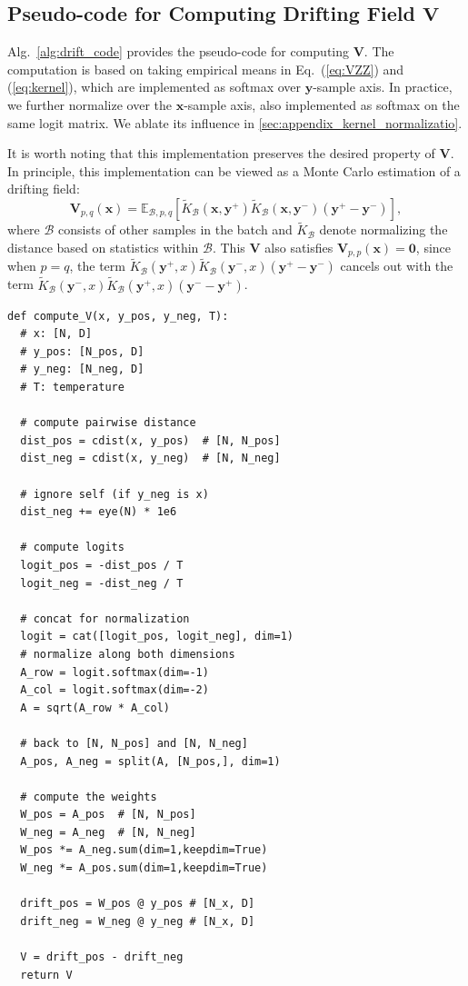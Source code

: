 \documentclass{article}
\newcommand{\vv}[1]{\mathbf{#1}}
\newcommand{\x}{\vv{x}}
\newcommand{\y}{\vv{y}}
\newcommand{\V}{\vv{V}}
\newcommand{\yp}{{\textcolor{blue}{\vv{y}^{+}}}}
\newcommand{\yn}{{\textcolor{orange}{\vv{y}^{-}}}}
\theoremstyle{plain}
\theoremstyle{definition}
\theoremstyle{remark}
\begin{document}
\subsection{Pseudo-code for Computing Drifting Field $\V$}
\label{sec:appendix_compute_V}

Alg.~\ref{alg:drift_code} provides the pseudo-code for computing $\V$. The computation is based on taking empirical means in Eq.~(\ref{eq:VZZ}) and (\ref{eq:kernel}), which are implemented as softmax over $\y$-sample axis. In practice, we further normalize over the $\x$-sample axis, also implemented as softmax on the same logit matrix.
We ablate its influence in \ref{sec:appendix_kernel_normalizatio}.

\renewcommand{\yn}{\y^{-}}
\renewcommand{\yp}{\y^{+}}
\newcommand{\B}{\mathcal{B}}

It is worth noting that this implementation preserves the desired property of $\V$.
In principle, this implementation can be viewed as a Monte Carlo estimation of a drifting field:
\begin{equation}
\V_{p,q}(\x)=\mathbb E_{\B,p,q}[\tilde K_\B(\x, \yp)\tilde K_\B(\x, \yn)(\yp-\yn)],
\end{equation}
where $\B$ consists of other samples in the batch and $\tilde K_\B$ denote normalizing the distance based on statistics within $\B$. This $\V$ also satisfies $\V_{p,p}(\x)=\mathbf 0$, since when $p=q$, the term  $\tilde K_\B(\yp, x)\tilde K_\B(\yn,x)(\yp-\yn)$ cancels out with the term $\tilde K_\B(\yn, x)\tilde K_\B(\yp,x)(\yn-\yp)$.

\begin{algorithm}[t]
\caption{Computing the drifting field $\V$.}
\label{alg:drift_code}
\begin{lstlisting}
def compute_V(x, y_pos, y_neg, T):
  # x: [N, D]
  # y_pos: [N_pos, D]
  # y_neg: [N_neg, D]
  # T: temperature

  # compute pairwise distance
  dist_pos = cdist(x, y_pos)  # [N, N_pos]
  dist_neg = cdist(x, y_neg)  # [N, N_neg]

  # ignore self (if y_neg is x)
  dist_neg += eye(N) * 1e6

  # compute logits
  logit_pos = -dist_pos / T
  logit_neg = -dist_neg / T

  # concat for normalization
  logit = cat([logit_pos, logit_neg], dim=1)
  # normalize along both dimensions
  A_row = logit.softmax(dim=-1)
  A_col = logit.softmax(dim=-2)
  A = sqrt(A_row * A_col)

  # back to [N, N_pos] and [N, N_neg]
  A_pos, A_neg = split(A, [N_pos,], dim=1)

  # compute the weights
  W_pos = A_pos  # [N, N_pos]
  W_neg = A_neg  # [N, N_neg]
  W_pos *= A_neg.sum(dim=1,keepdim=True)
  W_neg *= A_pos.sum(dim=1,keepdim=True)

  drift_pos = W_pos @ y_pos # [N_x, D]
  drift_neg = W_neg @ y_neg # [N_x, D]

  V = drift_pos - drift_neg
  return V
\end{lstlisting}
\end{algorithm}
\end{document}
